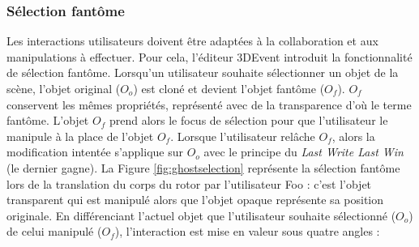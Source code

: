 \subsubsection{Sélection fantôme}
Les interactions utilisateurs doivent être adaptées à la collaboration et aux 
manipulations à effectuer. Pour cela, l'éditeur 3DEvent introduit la fonctionnalité de 
sélection \og fantôme\fg{}. Lorsqu'un utilisateur souhaite sélectionner un objet de 
la scène, l'objet original ($O_o$) est 
cloné et devient l'objet fantôme ($O_f$). $O_f$ conservent les mêmes propriétés, 
représenté avec de la 
transparence d'où le terme \og fantôme\fg{}. 
L'objet $O_f$ prend alors le focus de sélection pour que l'utilisateur le manipule à 
la place de l'objet $O_f$. 
Lorsque l'utilisateur relâche $O_f$, alors la modification intentée s'applique sur 
$O_o$ avec le principe du \textit{Last Write Last Win} (le dernier gagne).
La Figure \ref{fig:ghostselection} 
représente la sélection fantôme lors de la translation du corps du rotor par 
l'utilisateur Foo : c'est l'objet transparent qui est manipulé alors que l'objet opaque 
représente sa position originale. 
En différenciant l'actuel objet que l'utilisateur souhaite sélectionné ($O_{o}$) de 
celui manipulé ($O_f$), l'interaction est mise en valeur sous quatre angles :
